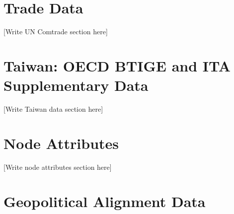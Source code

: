 
\section{Trade Data}
\label{sec:data_trade}


[Write UN Comtrade section here]

\section{Taiwan: OECD BTIGE and ITA Supplementary Data}
\label{sec:data_taiwan}


[Write Taiwan data section here]

\section{Node Attributes}
\label{sec:data_nodes}


[Write node attributes section here]

\section{Geopolitical Alignment Data}
\label{sec:data_geo}


